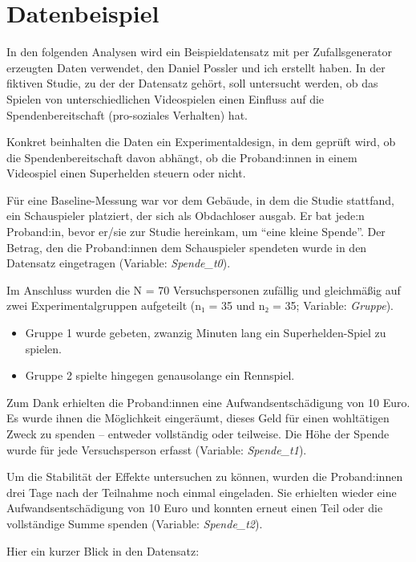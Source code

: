 \documentclass[
]{book}
\begin{document}
\hypertarget{datenbeispiel}{%
\section{Datenbeispiel}\label{datenbeispiel}}

In den folgenden Analysen wird ein Beispieldatensatz mit per Zufallsgenerator erzeugten Daten verwendet, den Daniel Possler und ich erstellt haben.
In der fiktiven Studie, zu der der Datensatz gehört, soll untersucht werden, ob das Spielen von unterschiedlichen Videospielen einen Einfluss auf die Spendenbereitschaft (pro-soziales Verhalten) hat.

Konkret beinhalten die Daten ein Experimentaldesign, in dem geprüft wird, ob die Spendenbereitschaft davon abhängt, ob die Proband:innen in einem Videospiel einen Superhelden steuern oder nicht.

Für eine Baseline-Messung war vor dem Gebäude, in dem die Studie stattfand, ein Schauspieler platziert, der sich als Obdachloser ausgab.
Er bat jede:n Proband:in, bevor er/sie zur Studie hereinkam, um ``eine kleine Spende''.
Der Betrag, den die Proband:innen dem Schauspieler spendeten wurde in den Datensatz eingetragen (Variable: \emph{Spende\_t0}).

Im Anschluss wurden die N = 70 Versuchspersonen zufällig und gleichmäßig auf zwei Experimentalgruppen aufgeteilt (n₁ = 35 und n₂ = 35; Variable: \emph{Gruppe}).

\begin{itemize}
\item
  Gruppe 1 wurde gebeten, zwanzig Minuten lang ein Superhelden-Spiel zu spielen.
\item
  Gruppe 2 spielte hingegen genausolange ein Rennspiel.
\end{itemize}

Zum Dank erhielten die Proband:innen eine Aufwandsentschädigung von 10 Euro. Es wurde ihnen die Möglichkeit eingeräumt, dieses Geld für einen wohltätigen Zweck zu spenden -- entweder vollständig oder teilweise.
Die Höhe der Spende wurde für jede Versuchsperson erfasst (Variable: \emph{Spende\_t1}).

Um die Stabilität der Effekte untersuchen zu können, wurden die Proband:innen drei Tage nach der Teilnahme noch einmal eingeladen.
Sie erhielten wieder eine Aufwandsentschädigung von 10 Euro und konnten erneut einen Teil oder die vollständige Summe spenden (Variable: \emph{Spende\_t2}).

Hier ein kurzer Blick in den Datensatz:
\end{document}
